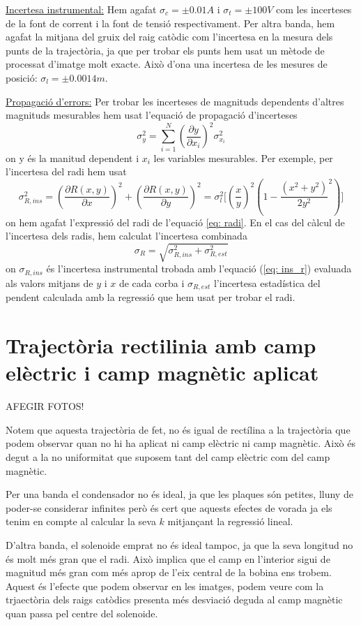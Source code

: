 \documentclass[11pt]{article}
\begin{document}
\underline{Incertesa instrumental:} Hem agafat $\sigma_{c}=\pm0.01A$ i $\sigma_{t}=\pm100V$ com les incerteses de la font de corrent i la font de tensió respectivament. Per altra banda, hem agafat la mitjana del gruix del raig catòdic com  l'incertesa en la mesura dels punts de la trajectòria, ja que per trobar els punts hem usat un mètode de processat d'imatge molt exacte. Això d'ona una incertesa de les mesures de posició: $\sigma_{l}=\pm0.0014m$.

\underline{Propagació d'errors:} Per trobar les incerteses de magnituds dependents d'altres magnituds mesurables hem usat l'equació de propagació d'incerteses
\begin{equation}
    \sigma_{y}^2=\sum_{i=1}^{N}(\frac{\partial y}{\partial x_i})^2\sigma_{x_i}^2
\end{equation}
on y és la manitud dependent i ${x_i}$ les variables mesurables.
Per exemple, per l'incertesa del radi hem usat 
\begin{equation}
    \sigma_{R,ins}^2 = (\frac{\partial R(x,y)}{\partial x})^2 +(\frac{\partial R(x,y)}{\partial y})^2= \sigma_{l}^2\bigg[(\frac{x}{y})^2(1-\frac{(x^2+y^2)}{2y^2}^2)\bigg]
    \label{eq: ins_r}
\end{equation}
on hem agafat l'expressió del radi de l'equació \ref{eq: radi}.
En el cas del càlcul de l'incertesa dels radis, hem calculat l'incertesa combinada 
\begin{equation}
    \sigma_{R}=\sqrt{\sigma_{R,ins}^2+\sigma_{R,est}^2}
\end{equation}
on $\sigma_{R,ins}$ és l'incertesa instrumental trobada amb l'equació (\ref{eq: ins_r}) evaluada als valors mitjans de $y$ i $x$ de cada corba i $\sigma_{R,est}$ l'incertesa estadística del pendent calculada amb la regressió que hem usat per trobar el radi.

\section{Trajectòria rectilinia amb camp elèctric i camp magnètic aplicat}\label{sec: traj_no_rect}

AFEGIR FOTOS!

Notem que aquesta trajectòria de fet, no és igual de rectílina a la trajectòria que podem observar quan no hi ha aplicat ni camp elèctric ni camp magnètic. Això és degut a la no uniformitat que suposem tant del camp elèctric com del camp magnètic. 

Per una banda el condensador no és ideal, ja que les plaques són petites, lluny de poder-se considerar infinites però és cert que aquests efectes de vorada ja els tenim en compte al calcular la seva $k$ mitjançant la regressió lineal. 

D'altra banda, el solenoide emprat no és ideal tampoc, ja que la seva longitud no és molt més gran que el radi. Això implica que el camp en l'interior sigui de magnitud més gran com més aprop de l'eix central de la bobina ens trobem. Aquest és l'efecte que podem observar en les imatges, podem veure com la trjaectòria dels raigs catòdics presenta més desviació deguda al camp magnètic quan passa pel centre del solenoide.
\end{document}
